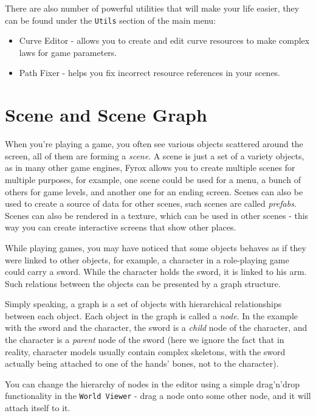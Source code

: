 \documentclass[
]{book}
\providecommand{\tightlist}{%
  \setlength{\itemsep}{0pt}\setlength{\parskip}{0pt}}
\theoremstyle{definition}
\theoremstyle{definition}
\theoremstyle{definition}
\theoremstyle{definition}
\theoremstyle{remark}
\begin{document}
There are also number of powerful utilities that will make your life easier, they can be found under the \texttt{Utils} section of the main menu:

\begin{itemize}
\tightlist
\item
  Curve Editor - allows you to create and edit curve resources to make complex laws for game parameters.
\item
  Path Fixer - helps you fix incorrect resource references in your scenes.
\end{itemize}

\section{Scene and Scene Graph}\label{scene-and-scene-graph}

When you're playing a game, you often see various objects scattered around the screen, all of them are forming a \emph{scene}. A scene is just a set of a variety objects, as in many other game engines, Fyrox allows you to create multiple scenes for multiple purposes, for example, one scene could be used for a menu, a bunch of others for game levels, and another one for an ending screen. Scenes can also be used to create a source of data for other scenes, such scenes are called \emph{prefabs}. Scenes can also be rendered in a texture, which can be used in other scenes - this way you can create interactive screens that show other places.

While playing games, you may have noticed that some objects behaves as if they were linked to other objects, for example, a character in a role-playing game could carry a sword. While the character holds the sword, it is linked to his arm. Such relations between the objects can be presented by a graph structure.

Simply speaking, a graph is a set of objects with hierarchical relationships between each object. Each object in the graph is called a \emph{node}. In the example with the sword and the character, the sword is a \emph{child} node of the character, and the character is a \emph{parent} node of the sword (here we ignore the fact that in reality, character models usually contain complex skeletons, with the sword actually being attached to one of the hands' bones, not to the character).

You can change the hierarchy of nodes in the editor using a simple drag'n'drop functionality in the \texttt{World\ Viewer} - drag a node onto some other node, and it will attach itself to it.
\end{document}
